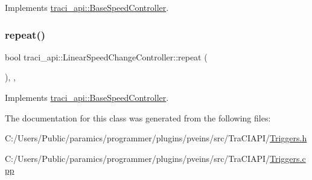 Implements \hyperlink{classtraci__api_1_1_base_speed_controller_ab9658ce36f91de8a34bb710b3241c210}{traci\+\_\+api\+::\+Base\+Speed\+Controller}.

\mbox{\label{classtraci__api_1_1_linear_speed_change_controller_aaa5f31ea0c57db838a5786509fc03446}} 
\subsubsection{\texorpdfstring{repeat()}{repeat()}}
{\footnotesize\ttfamily bool traci\+\_\+api\+::\+Linear\+Speed\+Change\+Controller\+::repeat (\begin{DoxyParamCaption}{ }\end{DoxyParamCaption})\hspace{0.3cm}{\ttfamily [inline]}, {\ttfamily [override]}, {\ttfamily [virtual]}}



Implements \hyperlink{classtraci__api_1_1_base_speed_controller_a2d4b22945d4cb27f5fe24b05700021b6}{traci\+\_\+api\+::\+Base\+Speed\+Controller}.



The documentation for this class was generated from the following files\+:\begin{DoxyCompactItemize}
\item 
C\+:/\+Users/\+Public/paramics/programmer/plugins/pveins/src/\+Tra\+C\+I\+A\+P\+I/\hyperlink{_triggers_8h}{Triggers.\+h}\item 
C\+:/\+Users/\+Public/paramics/programmer/plugins/pveins/src/\+Tra\+C\+I\+A\+P\+I/\hyperlink{_triggers_8cpp}{Triggers.\+cpp}\end{DoxyCompactItemize}
